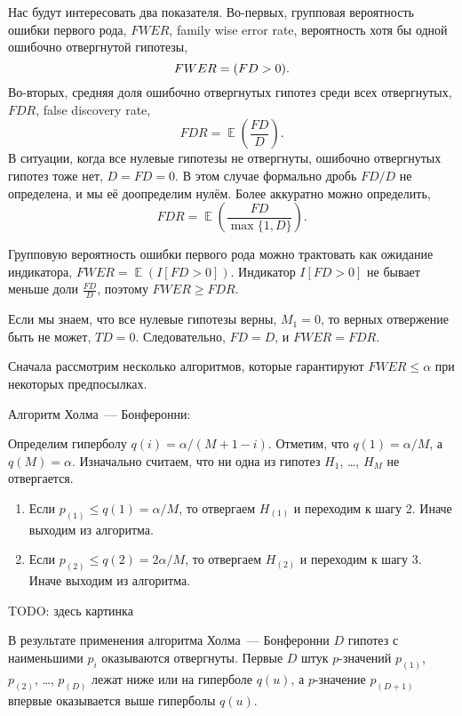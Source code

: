 \documentclass[12pt]{article}
\let\P\relax
\DeclareMathOperator{\P}{\mathbb{P}}
\DeclareMathOperator{\E}{\mathbb{E}}
\begin{document}
Нас будут интересовать два показателя.
Во-первых, групповая вероятность ошибки первого рода, $FWER$, family wise error rate, вероятность хотя бы одной ошибочно отвергнутой гипотезы,
\[
FWER = \P(FD > 0).
\]
Во-вторых, средняя доля ошибочно отвергнутых гипотез среди всех отвергнутых, $FDR$, false discovery rate, 
\[
FDR = \E\left(\frac{FD}{D}\right).
\]
В ситуации, когда все нулевые гипотезы не отвергнуты, ошибочно отвергнутых гипотез тоже нет, $D = FD = 0$.
В этом случае формально дробь $FD/D$ не определена, и мы её доопределим нулём.
Более аккуратно можно определить,
\[
FDR = \E\left(\frac{FD}{\max\{1, D\}}\right).
\]


Групповую вероятность ошибки первого рода можно трактовать как ожидание индикатора,
$FWER = \E(I[FD > 0])$.
Индикатор $I[FD > 0]$ не бывает меньше доли $\frac{FD}{D}$, поэтому $FWER \geq FDR$.

Если мы знаем, что все нулевые гипотезы верны, $M_1 = 0$, то верных отвержение быть не может, $TD = 0$.
Следовательно, $FD = D$, и $FWER = FDR$.




Сначала рассмотрим несколько алгоритмов, которые гарантируют $FWER \leq \alpha$ при некоторых предпосылках.



Алгоритм Холма~— Бонферонни:

Определим гиперболу $q(i) = \alpha / (M + 1 - i)$. 
Отметим, что $q(1) = \alpha/M$, а $q(M) = \alpha$. 
Изначально считаем, что ни одна из гипотез $H_1$, \dots, $H_M$ не отвергается.
\begin{enumerate}
    \item Если $p_{(1)} \leq q(1) = \alpha / M$, то отвергаем $H_{(1)}$ и переходим к шагу 2. 
    Иначе выходим из алгоритма.
    \item Если $p_{(2)} \leq q(2) = 2\alpha / M$, то отвергаем $H_{(2)}$ и переходим к шагу 3. 
    Иначе выходим из алгоритма.

\end{enumerate}

TODO: здесь картинка

В результате применения алгоритма Холма~— Бонферонни $D$ гипотез с наименьшими $p_i$ оказываются отвергнуты. 
Первые $D$ штук $p$-значений $p_{(1)}$, $p_{(2)}$, \dots, $p_{(D)}$ лежат ниже или на гиперболе $q(u)$, 
а $p$-значение $p_{(D+1)}$ впервые оказывается выше гиперболы $q(u)$.
\end{document}
